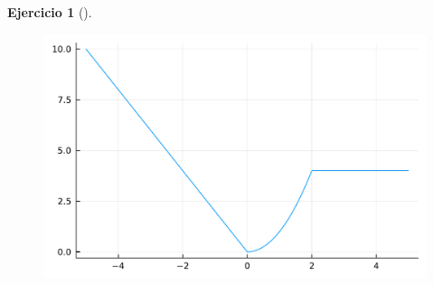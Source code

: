 \documentclass[
  a4paper,
]{scrreport}
\theoremstyle{definition}
\newtheorem{exercise}{Ejercicio}[chapter]
\theoremstyle{remark}
\begin{document}
\begin{exercise}[]
\begin{tcolorbox}
\begin{figure}[H]

{\centering \includegraphics{./funciones-elementales_files/figure-pdf/cell-19-output-1.pdf}

}

\end{figure}

\end{tcolorbox}

\end{exercise}
\end{document}
